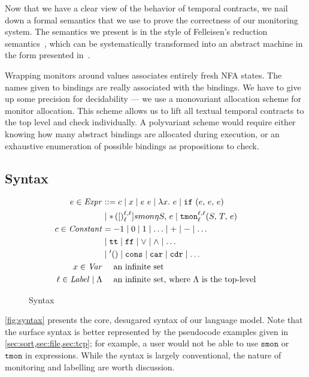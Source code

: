 Now that we have a clear view of the behavior of temporal contracts, we nail down a formal semantics that we use to prove the correctness of our monitoring system.
%
The semantics we present is in the style of Felleisen's reduction semantics~\citep{ianjohnson:Felleisen:2009:SEP:1795772}, which can be systematically transformed into an abstract machine in the form presented in~\citet{dvanhorn:VanHorn2010Abstracting}.

Wrapping monitors around values associates entirely fresh NFA states.
%
The names given to bindings are really associated with the bindings.
%
We have to give up some precision for decidability --- we use a monovariant allocation scheme for monitor allocation.
%
This scheme allows us to lift all textual temporal contracts to the top level and check individually.
%
A polyvariant scheme would require either knowing how many abstract bindings are allocated during execution, or an exhaustive enumeration of possible bindings as propositions to check.

\subsection{Syntax}

\begin{figure}
\begin{align*}
e \in \mathit{Expr} &::=
      c
 \mid x
 \mid e\ e
 \mid \lambda x.\ e
 \mid {\tt if}{\ }({e,\,e,\,e}) \\
&\mid {\tt *}{\,}({[})^{\ell,\ell}_{\ell}]{smon}{\eta}{S,\, e}
 \mid {\tt tmon}{^{\ell,\ell}_{\ell}}({S,\,T,\,e}) \\
c \in \mathit{Constant} &=
 -1 \mid 0 \mid 1 \mid \ldots \mid + \mid - \mid \ldots \\
&\mid {\tt tt} \mid {\tt ff} \mid \vee \mid \wedge \mid \ldots \\
&\mid {\tt '()} \mid {\tt cons} \mid {\tt car} \mid {\tt cdr} \mid \ldots \\
x \in \mathit{Var} &\quad\text{ an infinite set} \\
\ell \in \mathit{Label} \mid \Lambda &\quad\text{ an infinite set, where $\Lambda$ is the top-level}
\end{align*}
\caption{Syntax}
\label{fig:syntax}
\end{figure}

%
\autoref{fig:syntax} presents the core, desugared syntax of our language model.
%
Note that the surface syntax is better represented by the pseudocode examples given in \cref{sec:sort,sec:file,sec:tcp}; for example, a user would not be able to use $\mathtt{smon}$ or $\mathtt{tmon}$ in expressions.
%
While the syntax is largely conventional, the nature of monitoring and labelling are worth discussion.

